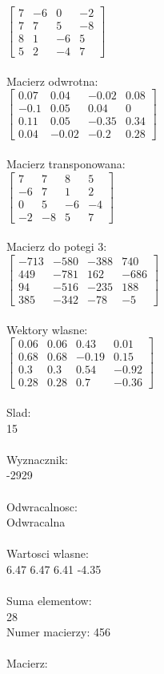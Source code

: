 \documentclass[a4paper,12pt]{article}
\begin{document}
$\begin{bmatrix} 7&-6&0&-2\\7&7&5&-8\\8&1&-6&5\\5&2&-4&7 \end{bmatrix}$
\\
\\
Macierz odwrotna:\\

$\begin{bmatrix} 0.07&0.04&-0.02&0.08\\-0.1&0.05&0.04&0\\0.11&0.05&-0.35&0.34\\0.04&-0.02&-0.2&0.28 \end{bmatrix}$
\\
\\
Macierz transponowana:\\

$\begin{bmatrix} 7&7&8&5\\-6&7&1&2\\0&5&-6&-4\\-2&-8&5&7 \end{bmatrix}$
\\
\\
Macierz do potegi 3:\\

$\begin{bmatrix} -713&-580&-388&740\\449&-781&162&-686\\94&-516&-235&188\\385&-342&-78&-5 \end{bmatrix}$
\\
\\
Wektory wlasne:\\

$\begin{bmatrix} 0.06&0.06&0.43&0.01\\0.68&0.68&-0.19&0.15\\0.3&0.3&0.54&-0.92\\0.28&0.28&0.7&-0.36 \end{bmatrix}$
\\
\\
Slad:\\
15
\\
\\
Wyznacznik:\\
-2929
\\
\\
Odwracalnosc:\\
Odwracalna
\\
\\
Wartosci wlasne:\\
6.47 6.47 6.41 -4.35
\\
\\
Suma elementow:\\
28
\\
\newpage
Numer macierzy:
456
\\
\\
Macierz:\\
\end{document}
